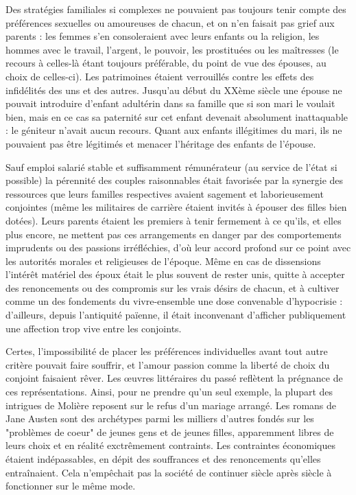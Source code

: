  Des stratégies familiales si complexes ne pouvaient pas toujours tenir compte des préférences sexuelles ou amoureuses de chacun, et on n'en faisait pas grief aux parents : les femmes s'en consoleraient avec leurs enfants ou la religion, les hommes avec le travail, l'argent, le pouvoir, les prostituées ou les maîtresses (le recours à celles-là étant toujours préférable, du point de vue des épouses, au choix de celles-ci). Les patrimoines étaient verrouillés contre les effets des infidélités des uns et des autres. Jusqu'au début du XXème siècle une épouse ne pouvait introduire d'enfant adultérin dans sa famille que si son mari le voulait bien, mais en ce cas sa paternité sur cet enfant devenait absolument inattaquable : le géniteur n'avait aucun recours. Quant aux enfants illégitimes du mari, ils ne pouvaient pas être légitimés et menacer l'héritage des enfants de l'épouse. 

 Sauf emploi salarié stable et suffisamment rémunérateur (au service de l'état si possible) la pérennité des couples raisonnables était favorisée par la synergie des ressources que leurs familles respectives avaient sagement et laborieusement conjointes (même les militaires de carrière étaient invités à épouser des filles bien dotées). Leurs parents étaient les premiers à tenir fermement à ce qu'ils, et elles plus encore, ne mettent pas ces arrangements en danger par des comportements imprudents ou des passions irréfléchies, d'où leur accord profond sur ce point avec les autorités morales et religieuses de l'époque. Même en cas de dissensions l'intérêt matériel des époux était le plus souvent de rester unis, quitte à accepter des renoncements ou des compromis sur les vrais désirs de chacun, et à cultiver comme un des fondements du vivre-ensemble une dose convenable d'hypocrisie : d'ailleurs, depuis l'antiquité païenne, il était inconvenant d'afficher publiquement une affection trop vive entre les conjoints. 

 Certes, l'impossibilité de placer les préférences individuelles avant tout autre critère pouvait faire souffrir, et l'amour passion comme la liberté de choix du conjoint faisaient rêver. Les œuvres littéraires du passé reflètent la prégnance de ces représentations. Ainsi, pour ne prendre qu'un seul exemple, la plupart des intrigues de Molière reposent sur le refus d'un mariage arrangé. Les romans de Jane Austen sont des archétypes parmi les milliers d'autres fondés sur les "problèmes de coeur" de jeunes gens et de jeunes filles, apparemment libres de leurs choix et en réalité exctrêmement contraints. Les contraintes économiques étaient indépassables, en dépit des souffrances et des renoncements qu'elles entraînaient. Cela n'empêchait pas la société de continuer siècle après siècle à fonctionner sur le même mode. 
 